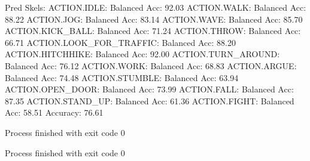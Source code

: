 Pred Skels:
ACTION.IDLE: Balanced Acc: 92.03%
ACTION.WALK: Balanced Acc: 88.22%
ACTION.JOG: Balanced Acc: 83.14%
ACTION.WAVE: Balanced Acc: 85.70%
ACTION.KICK_BALL: Balanced Acc: 71.24%
ACTION.THROW: Balanced Acc: 66.71%
ACTION.LOOK_FOR_TRAFFIC: Balanced Acc: 88.20%
ACTION.HITCHHIKE: Balanced Acc: 92.00%
ACTION.TURN_AROUND: Balanced Acc: 76.12%
ACTION.WORK: Balanced Acc: 68.83%
ACTION.ARGUE: Balanced Acc: 74.48%
ACTION.STUMBLE: Balanced Acc: 63.94%
ACTION.OPEN_DOOR: Balanced Acc: 73.99%
ACTION.FALL: Balanced Acc: 87.35%
ACTION.STAND_UP: Balanced Acc: 61.36%
ACTION.FIGHT: Balanced Acc: 58.51%
Accuracy: 76.61%

Process finished with exit code 0

Process finished with exit code 0

